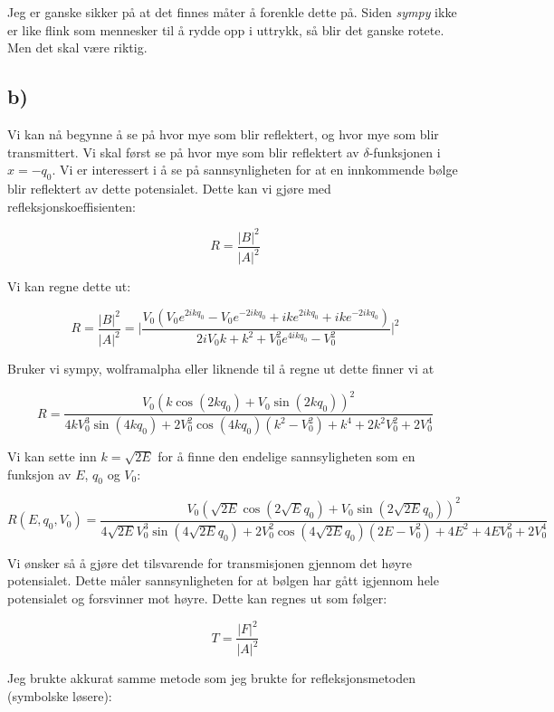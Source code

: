 \documentclass[a4paper,norsk, 10pt]{article}
\numberwithin{equation}{section}
\begin{document}
Jeg er ganske sikker på at det finnes måter å forenkle dette på. Siden \textit{sympy} ikke er like flink som mennesker til å rydde opp i uttrykk, så blir det ganske rotete. Men det skal være riktig.


\subsection*{b)}

Vi kan nå begynne å se på hvor mye som blir reflektert, og hvor mye som blir transmittert. Vi skal først se på hvor mye som blir reflektert av $\delta$-funksjonen i $x = -q_0$. Vi er interessert i å se på sannsynligheten for at en innkommende bølge blir reflektert av dette potensialet. Dette kan vi gjøre med refleksjonskoeffisienten:

\begin{equation}
R = \frac{|B|^2}{|A|^2}
\label{eq:refleks}
\end{equation}

Vi kan regne dette ut:

$$
R = \frac{|B|^2}{|A|^2} = \bigg|\frac{V_0\left(V_0e^{2ikq_0} - V_0e^{-2ikq_0} + ike^{2ikq_0} + ike^{-2ikq_0}\right)}{2iV_0k + k^2 +V_0^2e^{4ikq_0} - V_0^2}\bigg|^2
$$

Bruker vi sympy, wolframalpha eller liknende til å regne ut dette finner vi at 

$$
R = \frac{V_0\left(k\cos(2kq_0) + V_0\sin(2kq_0)\right)^2}{4kV_0^3\sin(4kq_0) + 2V_0^2\cos(4kq_0)(k^2 - V_0^2)+k^4 +2k^2V_0^2 + 2V_0^4}
$$

Vi kan sette inn $k = \sqrt{2E}$ for å finne den endelige sannsyligheten som en funksjon av $E$, $q_0$ og $V_0$:

\begin{equation}
R(E,q_0,V_0) = \frac{V_0\left(\sqrt{2E}\cos(2\sqrt{E}q_0) + V_0\sin(2\sqrt{2E} q_0)\right)^2}{4\sqrt{2E}V_0^3\sin(4\sqrt{2E} q_0) + 2V_0^2\cos(4\sqrt{2E} q_0)(2E - V_0^2)+4E^2 +4EV_0^2 + 2V_0^4}
\label{eq:R}
\end{equation}


Vi ønsker så å gjøre det tilsvarende for transmisjonen gjennom det høyre potensialet. Dette måler sannsynligheten for at bølgen har gått igjennom hele potensialet og forsvinner mot høyre. Dette kan regnes ut som følger:

\begin{equation}
T = \frac{|F|^2}{|A|^2}
\label{eq:transmit}
\end{equation}

Jeg brukte akkurat samme metode som jeg brukte for refleksjonsmetoden (symbolske løsere):
\end{document}
